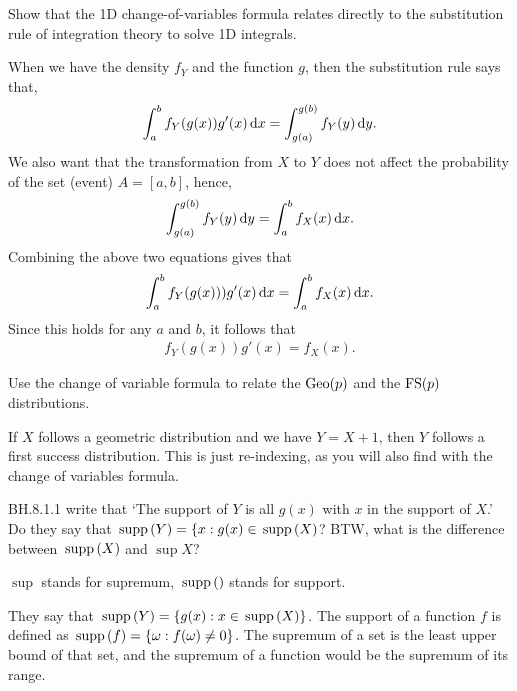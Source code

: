 \begin{exercise}
Show that the 1D change-of-variables formula relates directly to the substitution rule of integration theory to solve 1D integrals.
\begin{solution}
When we have the density  $f_{Y}$ and the function $g$, then the substitution rule says that,
\begin{align*}
\int_{a}^b f_{Y}(g(x)) g'(x)\,\textrm{d}x = \int_{g(a)}^{g(b)} f_{Y}(y) \,\textrm{d}y.
\end{align*}
We also want that the transformation from $X$ to $Y$ does not affect the probability of the set (event) $A = [a,b]$, hence,
\begin{align*}
\int_{g(a)}^{g(b)} f_{Y}(y) \,\textrm{d}y = \int_{a}^{b} f_{X}(x) \,\textrm{d}x.
\end{align*}
Combining the above two equations gives that
\begin{align*}
\int_{a}^{b} f_{Y}(g(x))) g'(x) \,\textrm{d}x = \int_{a}^{b} f_{X}(x) \,\textrm{d}x.
\end{align*}
Since this holds for any $a$ and $b$, it follows that
\begin{align*}
f_{Y}(g(x)) g'(x) = f_{X}(x).
\end{align*}
\end{solution}
\end{exercise}

\begin{exercise}
Use the change of variable formula to relate the $\mathrm{Geo}(p)$ and the $\mathrm{FS}(p)$ distributions.
\begin{solution}
If $X$ follows a geometric distribution and we have $Y=X+1$, then $Y$ follows a first success distribution. This is just re-indexing, as you will also find with the change of variables formula.
\end{solution}
\end{exercise}

\begin{exercise}
BH.8.1.1 write that `The support of $Y$ is all $g(x)$ with $x$ in the support of $X$.' Do they say that $\,\mathrm{supp}\left(Y\right) = \{x : g(x) \in \,\mathrm{supp}\left(X\right)$? BTW, what is the difference between $\,\mathrm{supp}\left(X\right)$ and $\sup{X}$?
\begin{hint}
  $\sup{}$ stands for supremum, $\,\mathrm{supp}\left(\right)$ stands for support.
\end{hint}
\begin{solution}
They say that $\,\mathrm{supp}\left(Y\right) = \{g(x):x\in\,\mathrm{supp}\left(X\right)\}$. The support of a function $f$ is defined as $\,\mathrm{supp}\left(f\right) = \{\omega:f(\omega)\neq0\}$. The supremum of a set is the least upper bound of that set, and the supremum of a function would be the supremum of its range.
\end{solution}
\end{exercise}


